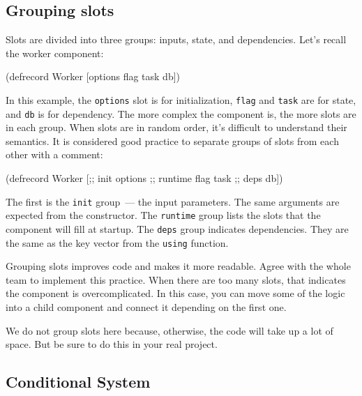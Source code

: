 \subsection{Grouping slots}


Slots are divided into three groups: inputs, state, and dependencies. Let's recall the worker component:

\begin{english}
  \begin{clojure}
(defrecord Worker
    [options flag task db])
  \end{clojure}
\end{english}

In this example, the \verb|options| slot is for initialization, \verb|flag| and \verb|task| are for state, and \verb|db| is for dependency. The more complex the component is, the more slots are in each group. When slots are in random order, it's difficult to understand their semantics. It is considered good practice to separate groups of slots from each other with a comment:

\begin{english}
  \begin{clojure}
(defrecord Worker
    [;; init
     options
     ;; runtime
     flag
     task
     ;; deps
     db])
  \end{clojure}
\end{english}

The first is the \verb|init| group~--- the input parameters. The same arguments are expected from the constructor. The \verb|runtime| group lists the slots that the component will fill at startup. The \verb|deps| group indicates dependencies. They are the same as the key vector from the \verb|using| function.

Grouping slots improves code and makes it more readable. Agree with the whole team to implement this practice. When there are too many slots, that indicates the component is overcomplicated. In this case, you can move some of the logic into a child component and connect it depending on the first one.

We do not group slots here because, otherwise, the code will take up a lot of space. But be sure to do this in your real project.

\subsection{Conditional System}

